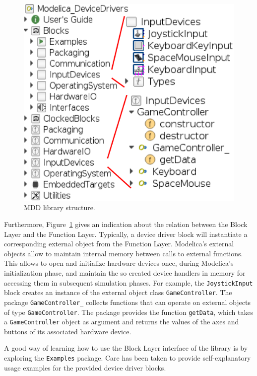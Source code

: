 \documentclass{resources/modelica}
\newcommand{\modelica}[1]{\lstinline[language=modelica]|#1|}
\begin{document}
\begin{figure}[htb]
  \centering
  \includegraphics[width=\columnwidth]{figures/MDDPackageBrowseScreenshot}
  \caption{MDD library structure.}
  \label{fig:MDDPackageBrowseScreenshot}
\end{figure}

Furthermore, Figure~\ref{fig:MDDPackageBrowseScreenshot} gives an indication
about the relation between the \textsf{Block Layer} and the \textsf{Function Layer}. Typically, a
device driver block will instantiate a corresponding external object from the
\textsf{Function Layer}. Modelica's external objects allow to maintain internal memory
between calls to external functions. This allows to open and initialize hardware
devices once, during Modelica's initialization phase, and maintain the so
created device handlers in memory for accessing them in subsequent simulation phases.
For example, the \modelica{JoystickInput} block creates an instance of the
external object class \mbox{\modelica{GameController}.} The package
\modelica{GameController_} collects functions that can operate on external
objects of type \modelica{GameController}. The package provides the function
\modelica{getData}, which takes a \modelica{GameController} object as
argument and returns the values of the axes and buttons of its associated
hardware device.

A good way of learning how to use the \textsf{Block Layer} interface of the library is by
exploring the \modelica{Examples} package. Care has been taken to provide
self-explanatory usage examples for the provided device driver blocks.
\end{document}
